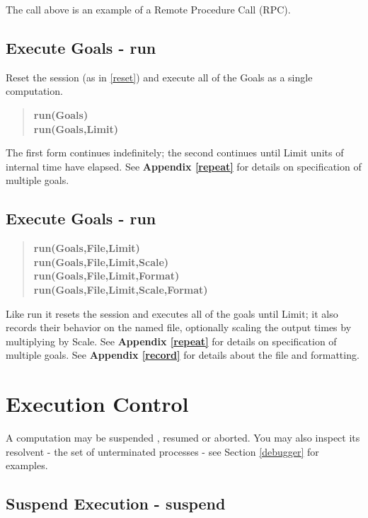 \documentclass[twoside,10pt]{report}
\begin{document}
\noindent
The call above is an example of a Remote Procedure Call (RPC).

\subsection{Execute Goals - run}
\label{runners}

Reset the session (as in \ref{reset}) and
execute all of the Goals as a single computation.

\begin{verse}
 {\bfseries
    run(Goals) \\
    run(Goals,Limit)
 }
\end{verse}

\noindent
The first form continues
indefinitely; the second continues until Limit units of internal time have 
elapsed.  See  {\bf Appendix \ref{repeat}} for details on specification 
of multiple goals.

\subsection{Execute Goals - run}
\label{recorders}
\begin{verse}
 {\bfseries
    run(Goals,File,Limit) \\
    run(Goals,File,Limit,Scale) \\
    run(Goals,File,Limit,Format) \\
    run(Goals,File,Limit,Scale,Format)
 }
\end{verse}

\noindent
Like run it resets the session and
executes all of the goals until Limit; it also records their behavior
on the named file, optionally scaling the output times by multiplying
by Scale.  See  {\bf Appendix \ref{repeat}} for
details on specification of multiple goals.  See
{\bf Appendix \ref{record}} for details about the file and formatting.

\section{Execution Control}
\noindent
A computation may be  suspended ,  resumed  or  aborted.  You may also
inspect its resolvent - the set of unterminated processes  - see
Section \ref{debugger} for examples.

\subsection{Suspend Execution - suspend}
\label{suspend}
\end{document}
